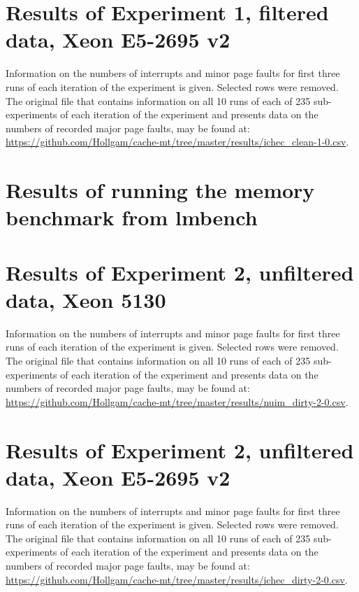 \begin{appendices}

\chapter{Results of Experiment 1, filtered data, Xeon E5-2695 v2}
\label{app:cycle-level-results-clean-ichec}

Information on the numbers of interrupts and minor page faults for first three runs of each iteration of the experiment is given. Selected rows were removed. The original file that contains information on all 10 runs of each of 235 sub-experiments of each iteration of the experiment and presents data on the numbers of recorded major page faults, may be found at: \url{https://github.com/Hollgam/cache-mt/tree/master/results/ichec\_clean-1-0.csv}.


\chapter{Results of running the memory benchmark from lmbench}
\label{app:lmbench-results}


\chapter{Results of Experiment 2, unfiltered data, Xeon 5130}
\label{app:app-level-results-2-nuim}

Information on the numbers of interrupts and minor page faults for first three runs of each iteration of the experiment is given. Selected rows were removed. The original file that contains information on all 10 runs of each of 235 sub-experiments of each iteration of the experiment and presents data on the numbers of recorded major page faults, may be found at: \url{https://github.com/Hollgam/cache-mt/tree/master/results/nuim\_dirty-2-0.csv}.


\chapter{Results of Experiment 2, unfiltered data, Xeon E5-2695 v2}
\label{app:app-level-results-2-ichec}

Information on the numbers of interrupts and minor page faults for first three runs of each iteration of the experiment is given. Selected rows were removed. The original file that contains information on all 10 runs of each of 235 sub-experiments of each iteration of the experiment and presents data on the numbers of recorded major page faults, may be found at: \url{https://github.com/Hollgam/cache-mt/tree/master/results/ichec\_dirty-2-0.csv}.


\end{appendices}
